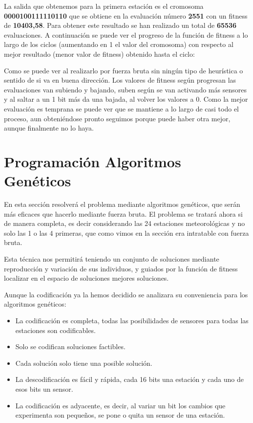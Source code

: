 \documentclass[12pt, spanish, pdftex]{UC3M_document}
\begin{document}
La salida que obtenemos para la primera estación es el cromosoma \textbf{0000100111110110} que se obtiene en la evaluación número \textbf{2551} con un fitness de \textbf{10403,58}. Para obtener este resultado se han realizado un total de \textbf{65536} evaluaciones. A continuación se puede ver el progreso de la función de fitness a lo largo de los ciclos (aumentando en 1 el valor del cromosoma) con respecto al mejor resultado (menor valor de fitness) obtenido hasta el ciclo:
\begin{figure}[H]
	{\def\svgwidth{.95\textwidth}
		}
\end{figure}
\vspace{-.7cm}
Como se puede ver al realizarlo por fuerza bruta sin ningún tipo de heurística o sentido de si va en buena dirección. Los valores de fitness según progresan las evaluaciones van subiendo y bajando, suben según se van activando más sensores y al saltar a un 1 bit más da una bajada, al volver los valores a 0. Como la mejor evaluación es temprana se puede ver que se mantiene a lo largo de casi todo el proceso, aun obteniéndose pronto seguimos porque puede haber otra mejor, aunque finalmente no lo haya.

\section{Programación Algoritmos Genéticos}
En esta sección resolverá el problema mediante algoritmos genéticos, que serán más eficaces que hacerlo mediante fuerza bruta. El problema se tratará ahora si de manera completa, es decir considerando las 24 estaciones meteorológicas y no solo las 1 o las 4 primeras, que como vimos en la sección era intratable con fuerza bruta.

Esta técnica nos permitirá teniendo un conjunto de soluciones mediante reproducción y variación de sus individuos, y guiados por la función de fitness localizar en el espacio de soluciones mejores soluciones.

Aunque la codificación ya la hemos decidido se analizara su conveniencia para los algoritmos genéticos:
\begin{itemize}
	\item La codificación es completa, todas las posibilidades de sensores para todas las estaciones son codificables.
	\item Solo se codifican soluciones factibles.
	\item Cada solución solo tiene una posible solución.
	\item La descodificación es fácil y rápida, cada 16 bits una estación y cada uno de esos bits un sensor.
	\item La codificación es adyacente, es decir, al variar un bit los cambios que experimenta son pequeños, se pone o quita un sensor de una estación.
\end{itemize}
\end{document}
